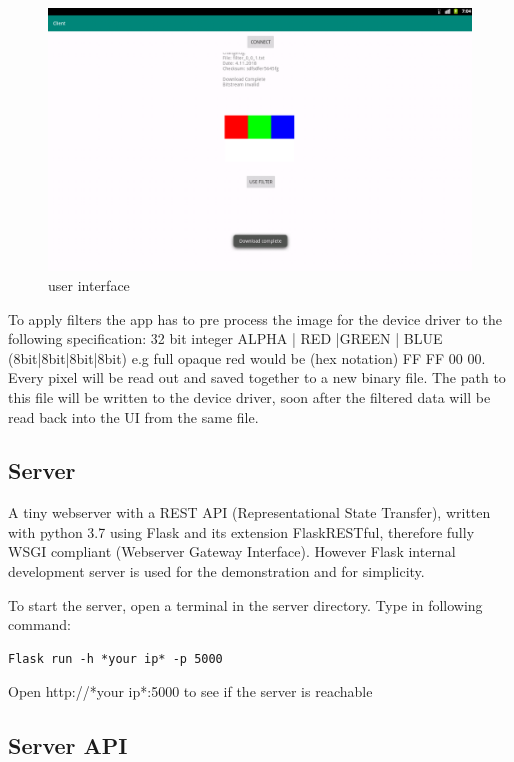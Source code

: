 \begin{figure}[h]
\centering
\includegraphics[width=1\textwidth]{sections/methodology/client_download.png}
\caption{\label{fig:gic} user interface}
\end{figure}

To apply filters the app has to pre process the image for the device driver to the following specification:
32 bit integer
ALPHA | RED |GREEN | BLUE (8bit|8bit|8bit|8bit) e.g full opaque red would be (hex notation) FF FF 00 00. Every pixel will be read out and saved together to a new binary file. 
The path to this file will be written to the device driver, soon after the filtered data will be read back into the UI from the same file.


\subsection{Server}

A tiny webserver with a REST API (Representational State Transfer), 
written with python 3.7 using Flask and its extension FlaskRESTful, therefore fully WSGI compliant
(Webserver Gateway Interface). However Flask internal development server is used for the demonstration and for simplicity.

To start the server, open a terminal in the server directory. Type in following command:
\begin{verbatim}
Flask run -h *your ip* -p 5000    
\end{verbatim}
Open http://*your ip*:5000 to see if the server is reachable

\subsection{Server API}

